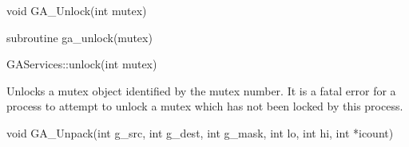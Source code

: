 \documentclass[12pt]{article}
\begin{document}

\begin{capi}
\begin{ccode}
void GA_Unlock(int mutex)
\end{ccode}
\begin{funcargs}
\end{funcargs}
\end{capi}

\begin{fapi}
\begin{fcode}
subroutine ga_unlock(mutex)
\end{fcode}
\begin{funcargs}
\end{funcargs}
\end{fapi}

\begin{cxxapi}
\begin{cxxcode}
GAServices::unlock(int mutex)
\end{cxxcode}
\begin{funcargs}
\end{funcargs}
\end{cxxapi}

\ncoll

\begin{desc}

Unlocks a mutex object identified by the mutex number. It is a fatal error for
a process to attempt to unlock a mutex which has not been locked by this
process.

\end{desc}



\begin{capi}
\begin{ccode}
void GA_Unpack(int g_src, int g_dest, int g_mask,
               int lo, int hi, int *icount)
\end{ccode}
\begin{funcargs}
\end{funcargs}
\end{capi}
\end{document}
